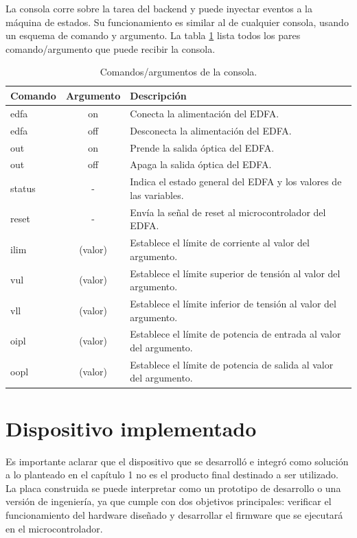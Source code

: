 La consola corre sobre la tarea del backend y puede inyectar eventos a la máquina de estados. Su funcionamiento es similar al de cualquier consola, usando un esquema de comando y argumento. La tabla \ref{tab:tablacmd} lista todos los pares comando/argumento que puede recibir la consola.

\begin{table}[H]
	\centering
	\caption{Comandos/argumentos de la consola.}
	\begin{tabular}{l c p{8cm}}
		\toprule
		\textbf{Comando} & \textbf{Argumento} & \textbf{Descripción} \\
		\midrule
		edfa	& on & Conecta la alimentación del EDFA.	\\
		edfa	& off & Desconecta la alimentación del EDFA. \\
		out	& on & Prende la salida óptica del EDFA. \\
		out   & off & Apaga la salida óptica del EDFA. \\
		status & - & Indica el estado general del EDFA y los valores de las variables. \\
		reset & - & Envía la señal de reset al microcontrolador del EDFA. \\
		ilim	& (valor) & Establece el límite de corriente al valor del argumento. \\
		vul	& (valor) & Establece el límite superior de tensión al valor del argumento. \\
		vll		& (valor) & Establece el límite inferior de tensión al valor del argumento. \\
		oipl	& (valor) & Establece el límite de potencia de entrada al valor del argumento. \\
		oopl & (valor) & Establece el límite de potencia de salida al valor del argumento. \\
		\bottomrule
		\hline
	\end{tabular}
	\label{tab:tablacmd}
\end{table}

\section{Dispositivo implementado}
\label{sec:dispImp}

Es importante aclarar que el dispositivo que se desarrolló e integró como solución a lo planteado en el capítulo 1 no es el producto final destinado a ser utilizado. La placa construida se puede interpretar como un prototipo de desarrollo o una versión de ingeniería, ya que cumple con dos objetivos principales: verificar el funcionamiento del hardware diseñado y desarrollar el firmware que se ejecutará en el microcontrolador. 

